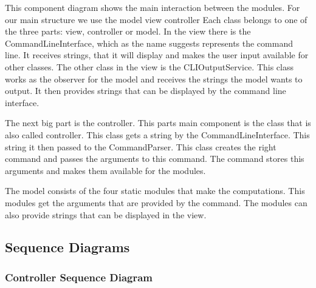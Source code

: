 \documentclass[parskip=full]{scrartcl}
\begin{document}
This component diagram shows the main interaction between the modules.
For our main structure we use the model view controller
Each class belongs to one of the three parts: view, controller or model.
In the view there is the CommandLineInterface, which as the name suggests represents the command line.
It receives strings, that it will display and makes the user input available for other classes.
The other class in the view is the CLIOutputService.
This class works as the observer for the model and receives the strings the model wants to output.
It then provides strings that can be displayed by the command line interface.

The next big part is the controller.
This parts main component is the class that is also called controller.
This class gets a string by the CommandLineInterface.
This string it then passed to the CommandParser.
This class creates the right command and passes the arguments to this command.
The command stores this arguments and makes them available for the modules.

The model consists of the four static modules that make the computations.
This modules get the arguments that are provided by the command.
The modules can also provide strings that can be displayed in the view.

\newpage
\begin{figure}[h]
\begin{center}

\label{Model View Controller Component Diagram}
\end{center}
\end{figure}
\newpage


\subsection{Sequence Diagrams}

\subsubsection{Controller Sequence Diagram}
\end{document}
